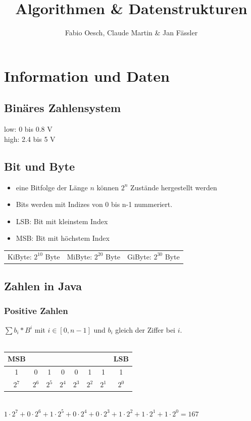 \documentclass[a4paper,10pt]{article}
\author{Fabio Oesch, Claude Martin \& Jan F\"assler}
\title{Algorithmen \& Datenstrukturen}
\begin{document}
\maketitle
\pagebreak
\section{Information und Daten}
\subsection{Bin\"ares Zahlensystem}
low: 0 bis 0.8 V\\
high: 2.4 bis 5 V\\
\subsection{Bit und Byte}
\begin{itemize}
\item eine Bitfolge der L\"ange $n$ k\"onnen $2^n$ Zust\"ande hergestellt werden
\item Bits werden mit Indizes von 0 bis n-1 nummeriert.
\item LSB: Bit mit kleinstem Index
\item MSB: Bit mit h\"ochstem Index
\end{itemize}
\begin{tabular}{l l l }
	KiByte: $2^{10}$ Byte &
	MiByte: $2^{20}$ Byte &
	GiByte: $2^{30}$ Byte
\end{tabular}

\subsection{Zahlen in Java}
\subsubsection{Positive Zahlen}
$\sum {b_i * B^i}$ mit $i \in [0,n-1]$ und $b_i$ gleich der Ziffer bei $i$. \\\\
\begin{tabular}{|c|c|c|c|c|c|c|c|}
\multicolumn{1}{c}{MSB}&\multicolumn{6}{c}{}&\multicolumn{1}{c}{LSB}\\ \hline
1&0&1&0&0&1&1&1\\\hline
\multicolumn{1}{c}{$2^7$}&\multicolumn{1}{c}{$2^6$}&\multicolumn{1}{c}{$2^5$}&\multicolumn{1}{c}{$2^4$}&\multicolumn{1}{c}{$2^3$}&\multicolumn{1}{c}{$2^2$}&\multicolumn{1}{c}{$2^1$}&\multicolumn{1}{c}{$2^0$}\\
\end{tabular}\\
$1\cdot 2^7+0\cdot 2^6+1\cdot 2^5+0\cdot 2^4+0\cdot 2^3+1\cdot 2^2+1\cdot 2^1+1\cdot 2^0=167$
\end{document}
